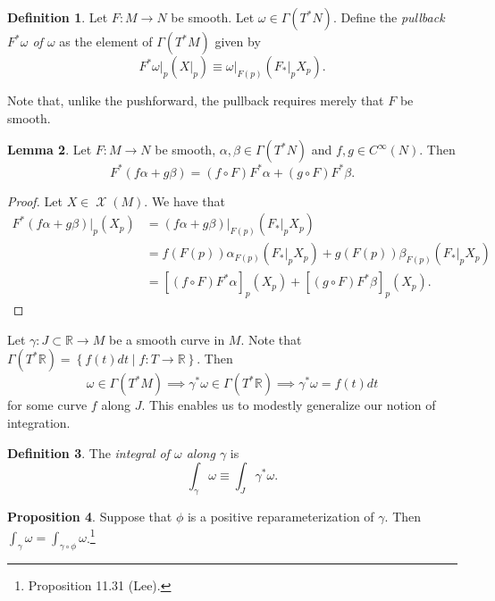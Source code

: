 \documentclass[10pt,letterpaper,cm]{nupset}
\theoremstyle{definition}
\newtheorem{definition}{Definition}[subsection]
\theoremstyle{theorem}
\newtheorem{lemma}[definition]{Lemma}
\newtheorem{prop}[definition]{Proposition}
\theoremstyle{remark}
\newcommand{\R}{\mathbb R}
\newcommand{\1}{\mathbf{1}}
\newcommand{\0}{\vec 0}
\DeclareMathOperator{\vf}{\mathscr{X}}
\begin{document}
\begin{definition}
Let $F: M \to N$ be smooth. Let $\omega \in \Gamma(T^{\ast}N)$. Define the \textit{pullback $F^{\ast}\omega$ of $\omega$}  as the  element of $\Gamma(T^{\ast}M)$ given by $$F^{\ast}\omega \bigr\rvert_p \left(X \bigr\rvert_p\right) \equiv \omega \bigr\rvert_{F(p)}\left(F_{\ast}\bigr\rvert_p X_p\right).$$ 
\end{definition}

Note that, unlike the pushforward, the pullback requires merely that $F$ be smooth. 

\begin{lemma}
Let $F: M \to N$ be smooth, $\alpha, \beta \in \Gamma(T^{\ast} N)$ and $f, g \in C^{\infty}(N)$. Then $$F^{\ast}(f \alpha + g \beta) = (f \circ F)F^{\ast} \alpha + (g \circ F)F^{\ast} \beta.$$
\end{lemma}
\begin{proof}
Let $X \in \vf(M)$. We have that
\begin{align*}
F^{\ast}(f \alpha + g\beta)\bigr\rvert_p(X_p) & = (f \alpha + g \beta)\bigr\rvert_{F(p)}\left(F_{\ast}\bigr\rvert_p X_p\right) 
\\ & = 
f\left(F(p)\right)\alpha_{F(p)}\left(F_{\ast}\bigr\rvert_p  X_p\right)+ g\left(F(p)\right)\beta_{F(p)}\left(F_{\ast}\bigr\rvert_p X_p\right)
\\ &   = \left[(f\circ F)F^{\ast}\alpha\right]_p (X_p) + \left[(g\circ F) F^{\ast}\beta\right]_p(X_p).
\end{align*}
\end{proof}

Let $\gamma : J \subset \R \to M$ be a smooth curve in $M$.  Note that $\Gamma(T^{\ast}\R) = \left\{f(t)dt \mid f : T \to \R\right\}$. Then
$$ \omega \in \Gamma(T^{\ast}M) \implies \gamma^{\ast} \omega \in \Gamma(T^{\ast}\R) \implies \gamma^{\ast}\omega = f(t)dt$$ for some curve $f$ along $J$. This enables us to modestly generalize our notion of integration.

\begin{definition}
The \textit{integral of $\omega$ along $\gamma$} is $$\int_{\gamma} \omega \equiv \int_J \gamma^{\ast}\omega.$$ 
\end{definition}

\begin{prop}
Suppose that $\phi$ is a positive reparameterization of $\gamma$. Then $\int_{\gamma} \omega = \int_{\gamma \circ \phi} \omega$.\footnote{Proposition 11.31 (Lee).}
\end{prop}
\end{document}
